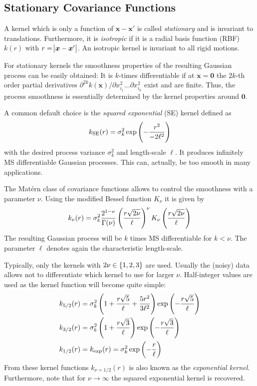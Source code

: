 \documentclass[11pt,a4paper]{scrreprt}
\newcommand{\vc}[1]{\bm{#1}}
\newcommand{\ped}[1]{_{\mathrm{#1}}}
\newcommand{\newterm}[1]{\emph{#1}}
\begin{document}
\subsection{Stationary Covariance Functions}
A kernel which is only a function of $\vc x - \vc x'$ is called 
\newterm{stationary} and is invariant to translations. Furthermore, it is 
\newterm{isotropic} if it is a radial basis function (RBF) $k(r)$ with $r 
= \abs{\vc x - \vc x'}$.  An isotropic kernel is invariant to all rigid motions.

For stationary kernels the smoothness properties of the resulting Gaussian 
process can be easily obtained: It is $k$-times differentiable if at $\vc 
x = \vc 0$ the $2k$-th order partial derivatives $\partial^{2k} k(\vc x) 
/ \partial x_{i_1}^2 \dots \partial x_{i_k}^2$ exist and are finite. Thus, the 
process smoothness is essentially determined by the kernel properties around 
$\vc 0$.

A common default choice is the \newterm{squared exponential} (SE) kernel defined 
as
\begin{equation}
    k\ped{SE}(r) = \sigma_k^2 \exp\del{-\frac{r^2}{-2\ell^2}}
\end{equation}
with the desired process variance $\sigma_k^2$ and length-scale $\ell$. It 
produces infinitely MS differentiable Gaussian processes. This can, actually, be 
too smooth in many applications.

The Mat\'ern class of covariance functions allows to control the smoothness with 
a parameter $\nu$. Using the modified Bessel function $K_{\nu}$ it is given by
\begin{equation}
    k_{\nu}(r) = \sigma_k^2 \frac{2^{1-\nu}}{\Gamma(\nu)} 
    \del{\frac{r\sqrt{2\nu}}{\ell}}^{\nu} K_{\nu} 
    \del{\frac{r\sqrt{2\nu}}{\ell}}
\end{equation}
The resulting Gaussian process will be $k$ times MS differentiable for $k 
< \nu$. The parameter $\ell$ denotes again the characteristic length-scale.

Typically, only the kernels with $2\nu \in \cbr{1, 2, 3}$ are used.  Usually the 
(noisy) data allows not to differentiate which kernel to use for larger $\nu$.  
Half-integer values are used as the kernel function will become quite simple:
\begin{align}
    k_{5/2}(r) &= \sigma_k^2 \del{1 + \frac{r\sqrt{5}}{\ell} 
        + \frac{5r^2}{3\ell^2}} \exp\del{-\frac{r\sqrt{5}}{\ell}} \\
    k_{3/2}(r) &= \sigma_k^2 \del{1 + \frac{r\sqrt{3}}{\ell}} 
    \exp\del{-\frac{r\sqrt{3}}{\ell}} \\
    k_{1/2}(r) &= k_{\exp}(r) = \sigma_k^2 \exp\del{-\frac{r}{\ell}}
\end{align}
From these kernel functions $k_{\nu=1/2}(r)$ is also known as the 
\newterm{exponential kernel}. Furthermore, note that for $\nu \rightarrow 
\infty$ the squared exponential kernel is recovered.
\end{document}
